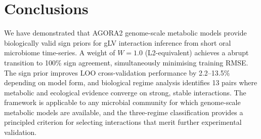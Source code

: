 \documentclass[11pt,a4paper]{article}
\begin{document}
\section{Conclusions}
\label{sec:conclusions}

We have demonstrated that AGORA2 genome-scale metabolic models provide
biologically valid sign priors for gLV interaction inference from short
oral microbiome time-series.
A weight of $W{=}1.0$ (L2-equivalent) achieves a abrupt transition to
100\% sign agreement, simultaneously minimising training RMSE.
The sign prior improves LOO cross-validation performance by 2.2--13.5\%
depending on model form, and biological regime analysis identifies 13 pairs
where metabolic and ecological evidence converge on strong, stable interactions.
The framework is applicable to any microbial community for which genome-scale
metabolic models are available, and the three-regime classification provides
a principled criterion for selecting interactions that merit further
experimental validation.



\end{document}
